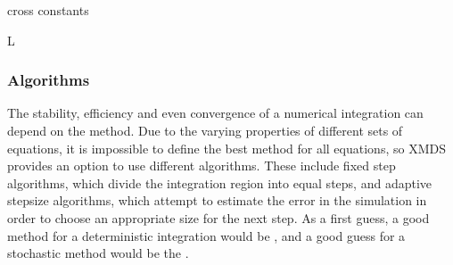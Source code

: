 \documentclass[letterpaper,10pt,english]{sphinxmanual}
\begin{document}
\begin{sphinxVerbatim}[commandchars=\\\{\}]
   
  cross
  constants
   
    \PYG{c+cp}{\PYGZlt{}![CDATA[}
        
        
    \PYG{c+cp}{]]\PYGZgt{}}

    
    L
    \PYG{c+cp}{\PYGZlt{}![CDATA[}
        
    \PYG{c+cp}{]]\PYGZgt{}}

  \PYG{c+cp}{\PYGZlt{}![CDATA[}
      
      \PYG{p}{[}\PYG{p}{]}
  \PYG{c+cp}{]]\PYGZgt{}}
\end{sphinxVerbatim}


\subsubsection{Algorithms}
\label{\detokenize{reference_elements:algorithms}}\label{\detokenize{reference_elements:id8}}
\sphinxAtStartPar
The stability, efficiency and even convergence of a numerical integration can depend on the method.  Due to the varying properties of different sets of equations, it is impossible to define the best method for all equations, so XMDS provides an option to use different algorithms.  These include fixed step algorithms, which divide the integration region into equal steps, and adaptive stepsize algorithms, which attempt to estimate the error in the simulation in order to choose an appropriate size for the next step.  As a first guess, a good method for a deterministic integration would be {\hyperref[\detokenize{reference_elements:ark45}]{}}, and a good guess for a stochastic method would be the {\hyperref[\detokenize{reference_elements:si}]{}}.
\end{document}
